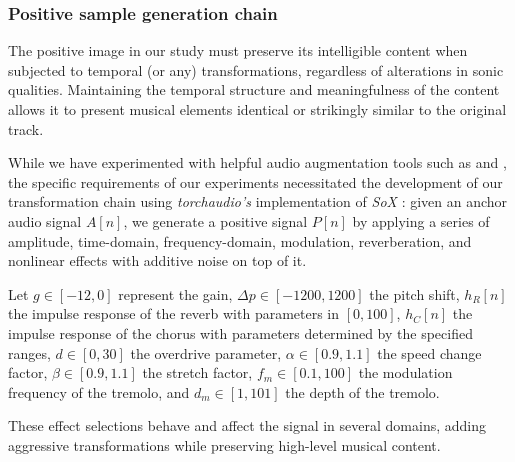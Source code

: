 \subsubsection{Positive sample generation chain}

The positive image in our study must preserve its intelligible content when subjected to temporal (or any) transformations, regardless of alterations in sonic qualities. Maintaining the temporal structure and meaningfulness of the content allows it to present musical elements identical or strikingly similar to the original track.

While we have experimented with helpful audio augmentation tools such as \cite{Spijkervet2021Spijkervet/torchaudio-augmentations:V1.0} and \cite{Kharitonov2020DataDomain}, the specific requirements of our experiments necessitated the development of our transformation chain using \textit{torchaudio's} \cite{Yang2021TorchAudio:Processing} implementation of \textit{SoX} \cite{sox}: given an anchor audio signal $A[n]$, we generate a positive signal $P[n]$ by applying a series of amplitude, time-domain, frequency-domain, modulation, reverberation, and nonlinear effects with additive noise on top of it. 

Let $g \in [-12, 0]$ represent the gain, $\Delta p \in [-1200, 1200]$ the pitch shift, $h_R[n]$ the impulse response of the reverb with parameters in $[0, 100]$, $h_C[n]$ the impulse response of the chorus with parameters determined by the specified ranges, $d \in [0, 30]$ the overdrive parameter, $\alpha \in [0.9, 1.1]$ the speed change factor, $\beta \in [0.9, 1.1]$ the stretch factor, $f_m \in [0.1, 100]$ the modulation frequency of the tremolo, and $d_m \in [1, 101]$ the depth of the tremolo. 

These effect selections behave and affect the signal in several domains, adding aggressive transformations while preserving high-level musical content.

